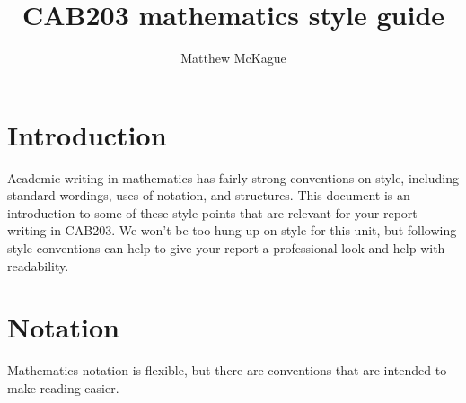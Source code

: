 \documentclass[a4paper]{article}
\author{Matthew McKague}
\title{CAB203 mathematics style guide}
\date{}
\begin{document}
\maketitle

\section{Introduction}
Academic writing in mathematics has fairly strong conventions on style, including standard wordings, uses of notation, and structures.  This document is an introduction to some of these style points that are relevant for your report writing in CAB203.  We won't be too hung up on style for this unit, but following style conventions can help to give your report a professional look and help with readability.

\section{Notation}
Mathematics notation is flexible, but there are conventions that are intended to make reading easier.
\end{document}
